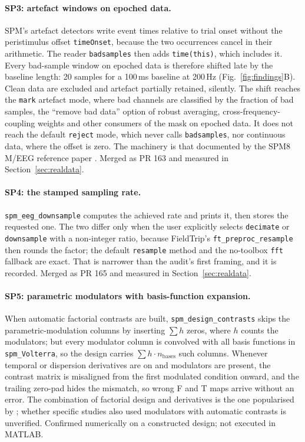\documentclass[11pt]{article}
\newcommand{\code}[1]{\texttt{#1}}
\begin{document}
\paragraph{SP3: artefact windows on epoched data.} SPM's artefact detectors write event times relative to trial onset without the peristimulus offset \code{timeOnset}, because the two occurrences cancel in their arithmetic. The reader \code{badsamples} then adds \code{time(this)}, which includes it. Every bad-sample window on epoched data is therefore shifted late by the baseline length: 20 samples for a 100\,ms baseline at 200\,Hz (Fig.~\ref{fig:findings}B). Clean data are excluded and artefact partially retained, silently. The shift reaches the \code{mark} artefact mode, where bad channels are classified by the fraction of bad samples, the ``remove bad data'' option of robust averaging, cross-frequency-coupling weights and other consumers of the mask on epoched data. It does not reach the default \code{reject} mode, which never calls \code{badsamples}, nor continuous data, where the offset is zero. The machinery is that documented by the SPM8 M/EEG reference paper \cite{litvak2011}. Merged as PR 163 and measured in Section~\ref{sec:realdata}.

\paragraph{SP4: the stamped sampling rate.} \code{spm\_eeg\_downsample} computes the achieved rate and prints it, then stores the requested one. The two differ only when the user explicitly selects \code{decimate} or \code{downsample} with a non-integer ratio, because FieldTrip's \code{ft\_preproc\_resample} then rounds the factor; the default \code{resample} method and the no-toolbox \code{fft} fallback are exact. That is narrower than the audit's first framing, and it is recorded. Merged as PR 165 and measured in Section~\ref{sec:realdata}.

\paragraph{SP5: parametric modulators with basis-function expansion.} When automatic factorial contrasts are built, \code{spm\_design\_contrasts} skips the parametric-modulation columns by inserting $\sum h$ zeros, where $h$ counts the modulators; but every modulator column is convolved with all basis functions in \code{spm\_Volterra}, so the design carries $\sum h \cdot n_{\mathrm{bases}}$ such columns. Whenever temporal or dispersion derivatives are on and modulators are present, the contrast matrix is misaligned from the first modulated condition onward, and the trailing zero-pad hides the mismatch, so wrong F and T maps arrive without an error. The combination of factorial design and derivatives is the one popularised by \cite{henson2002}; whether specific studies also used modulators with automatic contrasts is unverified. Confirmed numerically on a constructed design; not executed in MATLAB.
\end{document}
